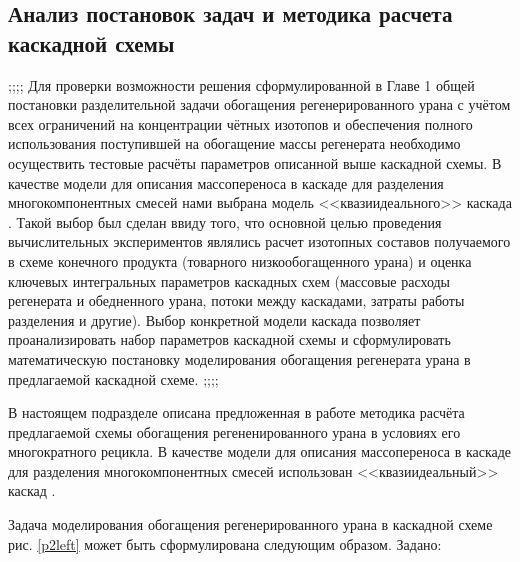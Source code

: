 
\subsection{Анализ постановок задач и методика расчета каскадной схемы}\label{statement}

;;;;
Для проверки возможности решения сформулированной в Главе 1 общей постановки разделительной задачи обогащения регенерированного урана с учётом всех ограничений на концентрации чётных изотопов и обеспечения полного использования поступившей на обогащение массы регенерата необходимо осуществить тестовые расчёты параметров описанной выше каскадной схемы. 
В качестве модели для описания массопереноса в каскаде для разделения многокомпонентных смесей нами выбрана модель <<квазиидеального>> каскада \cite{sazykinKvaziidealnyeKaskadyDlya2000}. Такой выбор был сделан ввиду того, что основной целью проведения вычислительных экспериментов являлись расчет изотопных составов получаемого в схеме конечного продукта (товарного низкообогащенного урана) и оценка ключевых интегральных параметров каскадных схем (массовые расходы регенерата и обедненного урана, потоки между каскадами, затраты работы разделения и другие). Выбор конкретной модели каскада позволяет проанализировать набор параметров каскадной схемы и сформулировать математическую постановку моделирования обогащения регенерата урана в предлагаемой каскадной схеме.
;;;;

В настоящем подразделе описана предложенная в работе методика расчёта предлагаемой схемы обогащения регененированного урана в условиях его многократного рецикла. В качестве модели для описания массопереноса в каскаде для разделения многокомпонентных смесей использован <<квазиидеальный>> каскад \cite{sazykinKvaziidealnyeKaskadyDlya2000}. 

Задача моделирования обогащения регенерированного урана в каскадной схеме рис. \ref{p2left} может быть сформулирована следующим образом.
Задано:

